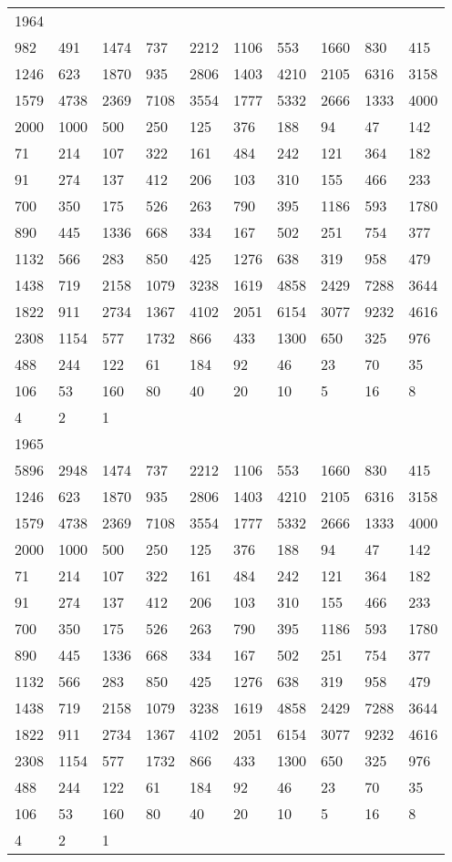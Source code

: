 \begin{longtable}{*{10}{l}}
1964&&&&&&&&&\\
982& 491& 1474& 737& 2212& 1106& 553& 1660& 830& 415\\
1246& 623& 1870& 935& 2806& 1403& 4210& 2105& 6316& 3158\\
1579& 4738& 2369& 7108& 3554& 1777& 5332& 2666& 1333& 4000\\
2000& 1000& 500& 250& 125& 376& 188& 94& 47& 142\\
71& 214& 107& 322& 161& 484& 242& 121& 364& 182\\
91& 274& 137& 412& 206& 103& 310& 155& 466& 233\\
700& 350& 175& 526& 263& 790& 395& 1186& 593& 1780\\
890& 445& 1336& 668& 334& 167& 502& 251& 754& 377\\
1132& 566& 283& 850& 425& 1276& 638& 319& 958& 479\\
1438& 719& 2158& 1079& 3238& 1619& 4858& 2429& 7288& 3644\\
1822& 911& 2734& 1367& 4102& 2051& 6154& 3077& 9232& 4616\\
2308& 1154& 577& 1732& 866& 433& 1300& 650& 325& 976\\
488& 244& 122& 61& 184& 92& 46& 23& 70& 35\\
106& 53& 160& 80& 40& 20& 10& 5& 16& 8\\
4& 2& 1& \\

1965&&&&&&&&&\\
5896& 2948& 1474& 737& 2212& 1106& 553& 1660& 830& 415\\
1246& 623& 1870& 935& 2806& 1403& 4210& 2105& 6316& 3158\\
1579& 4738& 2369& 7108& 3554& 1777& 5332& 2666& 1333& 4000\\
2000& 1000& 500& 250& 125& 376& 188& 94& 47& 142\\
71& 214& 107& 322& 161& 484& 242& 121& 364& 182\\
91& 274& 137& 412& 206& 103& 310& 155& 466& 233\\
700& 350& 175& 526& 263& 790& 395& 1186& 593& 1780\\
890& 445& 1336& 668& 334& 167& 502& 251& 754& 377\\
1132& 566& 283& 850& 425& 1276& 638& 319& 958& 479\\
1438& 719& 2158& 1079& 3238& 1619& 4858& 2429& 7288& 3644\\
1822& 911& 2734& 1367& 4102& 2051& 6154& 3077& 9232& 4616\\
2308& 1154& 577& 1732& 866& 433& 1300& 650& 325& 976\\
488& 244& 122& 61& 184& 92& 46& 23& 70& 35\\
106& 53& 160& 80& 40& 20& 10& 5& 16& 8\\
4& 2& 1& \\


\end{longtable}
